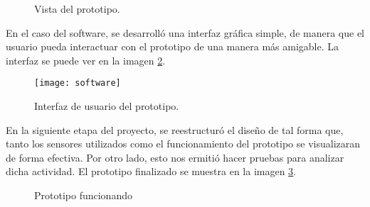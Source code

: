 \begin{figure}[H]
	\begin{center}
	\end{center}
	\label{hardwareda}
	\caption{Vista del prototipo.}
\end{figure} 

En el caso del software, se desarroll\'o una interfaz gr\'afica simple, de manera que el usuario pueda interactuar con el prototipo de una manera m\'as amigable. La interfaz se puede ver en la imagen \ref{software}.

\begin{figure}[H]
	\begin{center}
		\texttt{[image: software]}
	\end{center}
	\caption{Interfaz de usuario del prototipo.}
	\label{software}
\end{figure} 

En la siguiente etapa del proyecto, se reestructur\'o el dise\~no de tal forma que, tanto los sensores utilizados como el funcionamiento del prototipo se visualizaran de forma efectiva. Por otro lado, esto nos ermiti\'o hacer pruebas para analizar dicha actividad. El prototipo finalizado se muestra en la imagen \ref{hardwarep}.

\begin{figure}[H]
	\begin{center}
	\end{center}
	\label{hardwarep}
	\caption{Prototipo funcionando}
\end{figure}